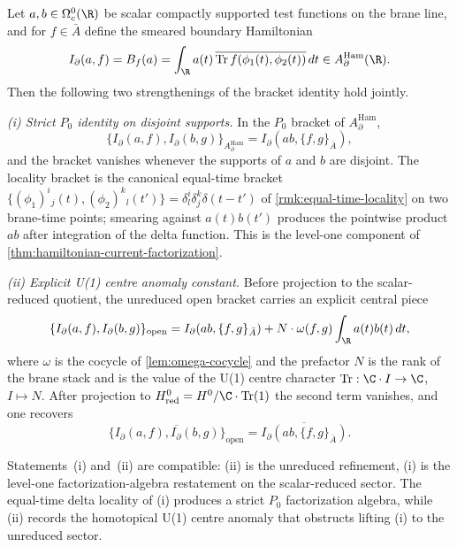 \documentclass[11pt]{memoir}
\begin{document}
\begin{cor}\label{cor:local-bulk-boundary-coupling}
  Let $a,b\in\Omega^0_c(\R)$ be scalar compactly supported test
  functions on the brane line, and for $f\in\bar A$ define the smeared
  boundary Hamiltonian
  $$I_\partial(a,f)
    =B_f(a)
    =\int_\R a(t)\,
      \overline{\mathrm{Tr}\,f(\phi_1(t),\phi_2(t))}\,dt
    \in A_\partial^{\mathrm{Ham}}(\R).$$
  Then the following two strengthenings of the bracket identity hold
  jointly.

  \emph{(i) Strict $P_0$ identity on disjoint supports.} In the $P_0$
  bracket of $A_\partial^{\mathrm{Ham}}$,
  $$\{I_\partial(a,f),I_\partial(b,g)\}_{A_\partial^{\mathrm{Ham}}}
    =I_\partial(ab,\{f,g\}_{\bar A}),$$
  and the bracket vanishes whenever the supports of $a$ and $b$ are
	  disjoint. The locality bracket is the canonical equal-time bracket
  $\{(\phi_1)^i{}_j(t),(\phi_2)^k{}_l(t')\}=\delta^i_l\delta^k_j\delta(t-t')$
  of \ref{rmk:equal-time-locality} on two brane-time points; smearing
  against $a(t)b(t')$ produces the pointwise product $ab$ after
  integration of the delta
  function. This is the level-one component of
  \ref{thm:hamiltonian-current-factorization}.

  \emph{(ii) Explicit U(1) centre anomaly constant.} Before projection
  to the scalar-reduced quotient, the unreduced open bracket carries an
  explicit central piece
  $$\{I_\partial(a,f),I_\partial(b,g)\}_{\mathrm{open}}
    =I_\partial(ab,\{f,g\}_{\bar A})
    +N\cdot\omega(f,g)\int_\R a(t)b(t)\,dt,$$
  where $\omega$ is the cocycle of \ref{lem:omega-cocycle} and the
  prefactor $N$ is the rank of the brane stack and is the value of the
  U(1) centre character $\mathrm{Tr}:\C\cdot I\to\C$, $I\mapsto N$.
  After projection to $H^0_{\mathrm{red}}=H^0/\C\cdot\mathrm{Tr}(1)$
  the second term vanishes, and one recovers
  $$\overline{\{I_\partial(a,f),I_\partial(b,g)\}_{\mathrm{open}}}
    =\overline{I_\partial(ab,\{f,g\}_{\bar A})}.$$

  Statements~(i) and~(ii) are compatible: (ii) is the unreduced
  refinement, (i) is the level-one factorization-algebra restatement
  on the scalar-reduced sector. The equal-time delta locality of (i)
  produces a strict $P_0$ factorization algebra, while (ii) records the
  homotopical U(1) centre anomaly that
  obstructs lifting (i) to the unreduced sector.
\end{cor}
\end{document}
